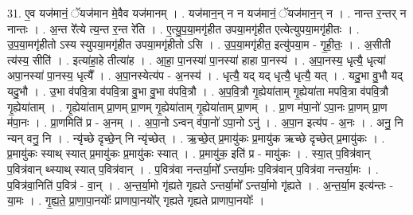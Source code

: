 \documentclass[17pt]{extarticle}
\begin{document}
31. ए॒व यज॑मानं॒ ॅयज॑मान मे॒वैव यज॑मानम् । . यज॑मान॒न् न न यज॑मानं॒ ॅयज॑मान॒न् न । . नान्त र॒न्तर् न नान्तः । . अ॒न्त रे᳚त्ये त्य॒न्त र॒न्त रे॑ति । . ए॒त्यु॒प॒या॒मगृ॑हीत उपया॒मगृ॑हीत एत्येत्युपया॒मगृ॑हीतः । . उ॒प॒या॒मगृ॑हीतो ऽस्य स्युपया॒मगृ॑हीत उपया॒मगृ॑हीतो ऽसि । . उ॒प॒या॒मगृ॑हीत॒ इत्यु॑पया॒म - गृ॒ही॒तः॒ । . अ॒सीती त्य॑स्य॒ सीति॑ । . इत्या॑हा॒हे तीत्या॑ह । . आ॒हा॒ पा॒नस्या॑ पा॒नस्या॑ हाहा पा॒नस्य॑ । . अ॒पा॒नस्य॒ धृत्यै॒ धृत्या॑ अपा॒नस्या॑ पा॒नस्य॒ धृत्यै᳚ । . अ॒पा॒नस्येत्य॑प - अ॒नस्य॑ । . धृत्यै॒ यद् यद् धृत्यै॒ धृत्यै॒ यत् । . यदु॒भा वु॒भौ यद् यदु॒भौ । . उ॒भा व॑पवि॒त्रा व॑पवि॒त्रा वु॒भा वु॒भा व॑पवि॒त्रौ । . अ॒प॒वि॒त्रौ गृ॒ह्येया॑ताम् गृ॒ह्येया॑ता मपवि॒त्रा व॑पवि॒त्रौ गृ॒ह्येया॑ताम् । . गृ॒ह्येया॑ताम् प्रा॒णम् प्रा॒णम् गृ॒ह्येया॑ताम् गृ॒ह्येया॑ताम् प्रा॒णम् । . प्रा॒ण म॑पा॒नो॑ ऽपा॒नः प्रा॒णम् प्रा॒ण म॑पा॒नः । . प्रा॒णमिति॑ प्र - अ॒नम् । . अ॒पा॒नो ऽन्वन् व॑पा॒नो॑ ऽपा॒नो ऽनु॑ । . अ॒पा॒न इत्य॑प - अ॒नः । . अनु॒ नि न्यन् वनु॒ नि । . न्यृ॑च्छे दृच्छे॒न् नि न्यृ॑च्छेत् । . ऋ॒च्छे॒त् प्र॒मायु॑कः प्र॒मायु॑क ऋच्छे दृच्छेत् प्र॒मायु॑कः । . प्र॒मायु॑कः स्याथ् स्यात् प्र॒मायु॑कः प्र॒मायु॑कः स्यात् । . प्र॒मायु॑क॒ इति॑ प्र - मायु॑कः । . स्या॒त् प॒वित्र॑वान् प॒वित्र॑वान् थ्स्याथ् स्यात् प॒वित्र॑वान् । . प॒वित्र॑वा नन्तर्या॒मो᳚ ऽन्तर्या॒मः प॒वित्र॑वान् प॒वित्र॑वा नन्तर्या॒मः । . प॒वित्र॑वा॒निति॑ प॒वित्र॑ - वा॒न् । . अ॒न्त॒र्या॒मो गृ॑ह्यते गृह्यते ऽन्तर्या॒मो᳚ ऽन्तर्या॒मो गृ॑ह्यते । . अ॒न्त॒र्या॒म इत्य॑न्तः - या॒मः । . गृ॒ह्य॒ते॒ प्रा॒णा॒पा॒नयोः᳚ प्राणापा॒नयो᳚र् गृह्यते गृह्यते प्राणापा॒नयोः᳚ । \newline
\end{document}
